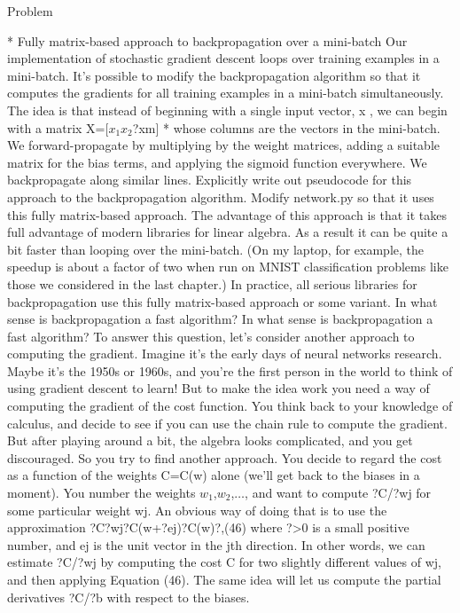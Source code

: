 Problem

* Fully matrix-based approach to backpropagation over a mini-batch Our implementation of stochastic gradient descent loops over training examples in a mini-batch. It's possible to modify the backpropagation algorithm so that it computes the gradients for all training examples in a mini-batch simultaneously. The idea is that instead of beginning with a single input vector, x
, we can begin with a matrix X=[$x_1$$x_2$?xm]
* whose columns are the vectors in the mini-batch. We forward-propagate by multiplying by the weight matrices, adding a suitable matrix for the bias terms, and applying the sigmoid function everywhere. We backpropagate along similar lines. Explicitly write out pseudocode for this approach to the backpropagation algorithm. Modify network.py so that it uses this fully matrix-based approach. The advantage of this approach is that it takes full advantage of modern libraries for linear algebra. As a result it can be quite a bit faster than looping over the mini-batch. (On my laptop, for example, the speedup is about a factor of two when run on MNIST classification problems like those we considered in the last chapter.) In practice, all serious libraries for backpropagation use this fully matrix-based approach or some variant. 
In what sense is backpropagation a fast algorithm?
In what sense is backpropagation a fast algorithm? To answer this question, let's consider another approach to computing the gradient. Imagine it's the early days of neural networks research. Maybe it's the 1950s or 1960s, and you're the first person in the world to think of using gradient descent to learn! But to make the idea work you need a way of computing the gradient of the cost function. You think back to your knowledge of calculus, and decide to see if you can use the chain rule to compute the gradient. But after playing around a bit, the algebra looks complicated, and you get discouraged. So you try to find another approach. You decide to regard the cost as a function of the weights C=C(w)
alone (we'll get back to the biases in a moment). You number the weights $w_1$,$w_2$,$\ldots$, and want to compute ?C/?wj for some particular weight wj. An obvious way of doing that is to use the approximation 
?C?wj?C(w+?ej)?C(w)?,(46)
where ?>0 is a small positive number, and ej is the unit vector in the jth direction. In other words, we can estimate ?C/?wj by computing the cost C for two slightly different values of wj, and then applying Equation (46). The same idea will let us compute the partial derivatives ?C/?b
with respect to the biases.
$$
